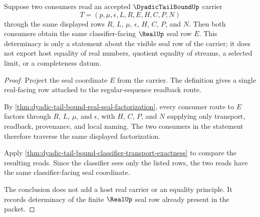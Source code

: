 \begin{theorem}
\label{thm:dyadic-tail-bound-seal-consumer-determinacy}
Suppose two consumers read an accepted $\DyadicTailBoundUp$ carrier
$$
T=(p,\mu,\epsilon,L,R,E,H,C,P,N)
$$
through the same displayed rows $R$, $L$, $\mu$, $\epsilon$, $H$, $C$, $P$, and $N$. Then both consumers obtain the same classifier-facing $\RealUp$ seal row $E$. This determinacy is only a statement about the visible seal row of the carrier; it does not export host equality of real numbers, quotient equality of streams, a selected limit, or a completeness datum.
\end{theorem}
\begin{proof}
Project the seal coordinate $E$ from the carrier. The definition gives a single real-facing row attached to the regular-sequence readback route.

By \autoref{thm:dyadic-tail-bound-real-seal-factorization}, every consumer route to $E$ factors through $R$, $L$, $\mu$, and $\epsilon$, with $H$, $C$, $P$, and $N$ supplying only transport, readback, provenance, and local naming. The two consumers in the statement therefore traverse the same displayed factorization.

Apply \autoref{thm:dyadic-tail-bound-classifier-transport-exactness} to compare the resulting reads. Since the classifier sees only the listed rows, the two reads have the same classifier-facing seal coordinate.

The conclusion does not add a host real carrier or an equality principle. It records determinacy of the finite $\RealUp$ seal row already present in the packet.
\end{proof}

